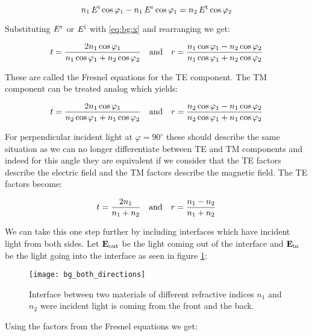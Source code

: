 \begin{equation}
    n_1 \, E^{\mathrm{i}} \cos \varphi_1 - n_1 \, E^{\mathrm{r}} \cos \varphi_1 =
    n_2 \, E^{\mathrm{t}} \cos \varphi_2
\end{equation}

Substituting $E^{\mathrm{r}}$ or $E^{\mathrm{i}}$ with \eqref{eq:bg:x} and rearranging we get:

\begin{equation}
    t = \frac{2 n_1 \cos \varphi_1}{n_1 \cos \varphi_1 + n_2 \cos \varphi_2}
    \qq{and}
    r = \frac{n_1 \cos \varphi_1 - n_2 \cos \varphi_2}{
    n_1 \cos \varphi_1 + n_2 \cos \varphi_2}
\end{equation}

These are called the Fresnel equations for the TE component. The TM component can be treated analog which yields:

\begin{equation}
    t = \frac{2 n_1 \cos \varphi_1}{n_2 \cos \varphi_1 + n_1 \cos \varphi_2}
    \qq{and}
    r = \frac{n_2 \cos \varphi_1 - n_1 \cos \varphi_2}{
    n_2 \cos \varphi_1 + n_1 \cos \varphi_2}
\end{equation}

For perpendicular incident light at $\varphi = 90^\circ$ these should describe the same situation as we can no longer differentiate between TE and TM components and indeed for this angle they are equivalent if we consider that the TE factors describe the electric field and the TM factors describe the magnetic field. The TE factors become:

\begin{equation}
    t = \frac{2 n_1}{n_1 + n_2} \qq{and} r = \frac{n_1 - n_2}{n_1 + n_2}
\end{equation}

We can take this one step further by including interfaces which have incident light from both sides. Let $\vb E_{\mathrm{out}}$ be the light coming out of the interface and $\vb E_{\mathrm{in}}$ be the light going into the interface as seen in figure \ref{fig:bg:both}:

\begin{figure}[H]
    \centering
    \texttt{[image: bg\_both\_directions]}
    \caption{Interface between two materials of different refractive indices $n_1$ and $n_2$ were incident light is coming from the front and the back.}
    \label{fig:bg:both}
\end{figure}

Using the factors from the Fresnel equations we get:

